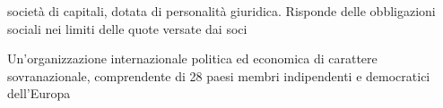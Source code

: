 \begin{acronym}
\begin{multicols}{2}
		   {\newline \small società di capitali, dotata di personalità giuridica. Risponde delle obbligazioni sociali nei limiti delle quote versate dai soci\par}


		   {\newline \small Un'organizzazione internazionale politica ed economica di carattere sovranazionale, comprendente di 28 paesi membri indipendenti e democratici dell'Europa\cite{paesiUE} \par}
\end{multicols}
\end{acronym}